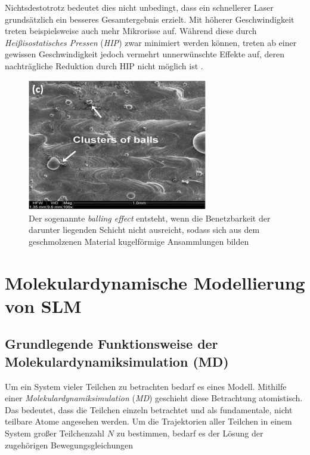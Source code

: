 		Nichtsdestotrotz bedeutet dies nicht unbedingt, dass ein schnellerer Laser grundsätzlich
		ein besseres Gesamtergebnis erzielt. Mit höherer Geschwindigkeit treten beispielsweise
		auch mehr Mikrorisse auf. Während diese durch \emph{Heißisostatisches Pressen}
		(\emph{HIP}) zwar minimiert werden können, treten ab einer gewissen Geschwindigkeit jedoch
		vermehrt unnerwünschte Effekte auf, deren nachträgliche Reduktion durch HIP nicht möglich
		ist \cite{sadali2020influence}.

		\begin{figure}[!ht]
			\centering
			\includegraphics[width=0.7\textwidth]{chapter/main/img/defects/balling.png}
			\caption{Der sogenannte \emph{balling effect} entsteht, wenn die Benetzbarkeit der
			darunter liegenden Schicht nicht ausreicht, sodass sich aus dem geschmolzenen
			Material kugelförmige Ansammlungen bilden \cite{eskandarisabzi2019defect}}
			\label{fig:defects_balling}
		\end{figure}


\section{Molekulardynamische Modellierung von SLM}
	\subsection{Grundlegende Funktionsweise der Molekulardynamiksimulation (MD)}
		Um ein System vieler Teilchen zu betrachten bedarf es eines Modell. Mithilfe einer
		\emph{Molekulardynamiksimulation} (\emph{MD}) geschieht diese Betrachtung atomistisch.
		Das bedeutet, dass die Teilchen einzeln betrachtet und als fundamentale, nicht teilbare
		Atome angesehen werden. Um die Trajektorien aller Teilchen in einem System großer
		Teilchenzahl $N$ zu bestimmen, bedarf es der Lösung der zugehörigen Bewegungsgleichungen

